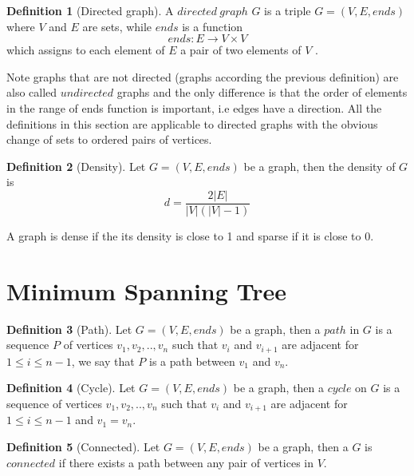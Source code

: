 \documentclass{report}
\theoremstyle{plain}
\theoremstyle{definition}
\newtheorem{definition}{Definition}
\theoremstyle{remark}
\begin{document}
\begin{definition}[Directed graph]
A $directed \ graph$  $G$ is a triple $G = (V, E, ends)$ where $V$ and $E$ are sets, while $ends$ is a function 
  \begin{equation}
  ends:E\to V \times V
  \end{equation}
which assigns to each element of $E$ a pair of two elements of $V$ .
\end{definition}

Note graphs that are not directed (graphs according the previous definition) are also called $undirected$ graphs and the only difference is that the order of elements in the range of ends function is important, i.e edges have a direction. All the definitions in this section are applicable to directed graphs with the obvious change of sets to ordered pairs of vertices.

\begin{definition}[Density]

Let $G = (V, E, ends)$ be a graph, then the density of $G$ is 
  \begin{equation}
  d=\frac{2|E|}{|V|(|V|-1)}
  \end{equation}
\end{definition}

A graph is dense if the its density is close to 1 and sparse if it is close to 0.

\section*{Minimum Spanning Tree}

\begin{definition}[Path]
Let $G = (V, E, ends)$ be a graph, then a $path$ in $G$ is a sequence $P$ of vertices $v_1,v_2,..,v_n$ such that $v_i$ and $v_{i+1}$ are adjacent for $1 \leq i \leq n - 1$, we say that $P$ is a path between $v_1$ and $v_n$.
\end{definition}

\begin{definition}[Cycle]
Let $G = (V, E, ends)$ be a graph, then a $cycle$ on $G$ is a sequence of vertices $v_1,v_2,..,v_n$ such that $v_i$ and $v_{i+1}$ are adjacent for $1 \leq i \leq n - 1$ and $v_1=v_n$.
\end{definition}

\begin{definition}[Connected]
Let $G = (V, E, ends)$ be a graph, then a $G$ is $connected$ if there exists a path between any pair of vertices in $V$.
\end{definition}
\end{document}
